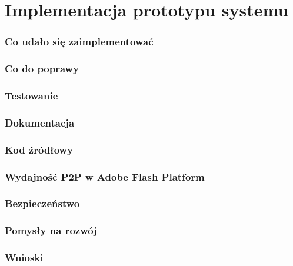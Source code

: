 \chapter{Implementacja prototypu systemu}
\label{cha:ImplementacjaPrototypu}

\subsection{Co udało się zaimplementować}



\subsection{Co do poprawy}

\subsection{Testowanie}

\subsection{Dokumentacja}

\subsection{Kod źródłowy}

\subsection{Wydajność P2P w Adobe Flash Platform}

\subsection{Bezpieczeństwo}

\subsection{Pomysły na rozwój}

\subsection{Wnioski}


\newpage

